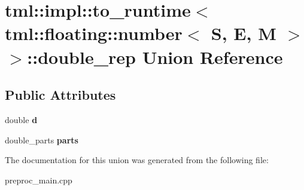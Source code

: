 \hypertarget{uniontml_1_1impl_1_1to__runtime_3_01tml_1_1floating_1_1number_3_01S_00_01E_00_01M_01_4_01_4_1_1double__rep}{\section{tml\+:\+:impl\+:\+:to\+\_\+runtime$<$ tml\+:\+:floating\+:\+:number$<$ S, E, M $>$ $>$\+:\+:double\+\_\+rep Union Reference}
\label{uniontml_1_1impl_1_1to__runtime_3_01tml_1_1floating_1_1number_3_01S_00_01E_00_01M_01_4_01_4_1_1double__rep}
}
\subsection*{Public Attributes}
\begin{DoxyCompactItemize}
\item 
\hypertarget{uniontml_1_1impl_1_1to__runtime_3_01tml_1_1floating_1_1number_3_01S_00_01E_00_01M_01_4_01_4_1_1double__rep_a35d9d77932836c3f4904013b4c838c0e}{double {\bfseries d}}\label{uniontml_1_1impl_1_1to__runtime_3_01tml_1_1floating_1_1number_3_01S_00_01E_00_01M_01_4_01_4_1_1double__rep_a35d9d77932836c3f4904013b4c838c0e}

\item 
\hypertarget{uniontml_1_1impl_1_1to__runtime_3_01tml_1_1floating_1_1number_3_01S_00_01E_00_01M_01_4_01_4_1_1double__rep_ab2fc2ccd5b4604864f5858fd6afe9cb0}{double\+\_\+parts {\bfseries parts}}\label{uniontml_1_1impl_1_1to__runtime_3_01tml_1_1floating_1_1number_3_01S_00_01E_00_01M_01_4_01_4_1_1double__rep_ab2fc2ccd5b4604864f5858fd6afe9cb0}

\end{DoxyCompactItemize}


The documentation for this union was generated from the following file\+:\begin{DoxyCompactItemize}
\item 
preproc\+\_\+main.\+cpp\end{DoxyCompactItemize}
